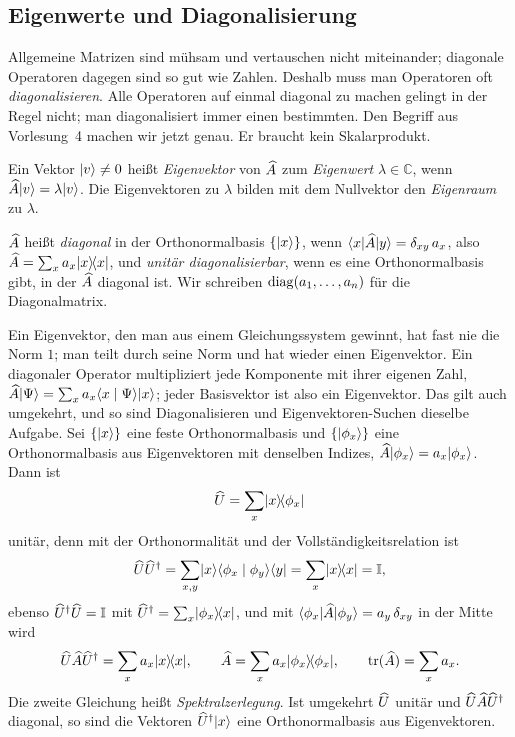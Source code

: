 \subsection{Eigenwerte und Diagonalisierung}
Allgemeine Matrizen sind mühsam und vertauschen nicht miteinander; diagonale Operatoren dagegen sind so gut wie Zahlen. Deshalb muss man Operatoren oft \emph{diagonalisieren}. Alle Operatoren auf einmal diagonal zu machen gelingt in der Regel nicht; man diagonalisiert immer einen bestimmten. Den Begriff aus Vorlesung~4 machen wir jetzt genau. Er braucht kein Skalarprodukt.
\begin{definition}
	Ein Vektor $\lvert v \rangle\neq 0$ heißt \emph{Eigenvektor} von $\widehat{A}$ zum \emph{Eigenwert} $\lambda\in\mathbb{C}$, wenn $\widehat{A}\lvert v \rangle = \lambda\lvert v \rangle$. Die Eigenvektoren zu $\lambda$ bilden mit dem Nullvektor den \emph{Eigenraum} zu $\lambda$.

	$\widehat{A}$ heißt \emph{diagonal} in der Orthonormalbasis $\{\lvert x \rangle\}$, wenn $\langle x \rvert \widehat{A} \lvert y \rangle = \delta_{xy}\,a_x$, also $\widehat{A} = \sum_x a_x\lvert x \rangle\!\langle x \rvert$, und \emph{unitär diagonalisierbar}, wenn es eine Orthonormalbasis gibt, in der $\widehat{A}$ diagonal ist. Wir schreiben $\operatorname{diag}(a_1,\dots,a_n)$ für die Diagonalmatrix.
\end{definition}
Ein Eigenvektor, den man aus einem Gleichungssystem gewinnt, hat fast nie die Norm $1$; man teilt durch seine Norm und hat wieder einen Eigenvektor. Ein diagonaler Operator multipliziert jede Komponente mit ihrer eigenen Zahl, $\widehat{A}\lvert \Psi \rangle = \sum_x a_x\langle x \mid \Psi \rangle\lvert x \rangle$; jeder Basisvektor ist also ein Eigenvektor. Das gilt auch umgekehrt, und so sind Diagonalisieren und Eigenvektoren-Suchen dieselbe Aufgabe. Sei $\{\lvert x \rangle\}$ eine feste Orthonormalbasis und $\{\lvert \phi_x \rangle\}$ eine Orthonormalbasis aus Eigenvektoren mit denselben Indizes, $\widehat{A}\lvert \phi_x \rangle = a_x\lvert \phi_x \rangle$. Dann ist
\begin{equation}
	\widehat{U} = \sum_x \lvert x \rangle\!\langle \phi_x \rvert
\end{equation}
unitär, denn mit der Orthonormalität und der Vollständigkeitsrelation ist
\begin{equation}
	\widehat{U}\widehat{U}^{\dagger} = \sum_{x,y} \lvert x \rangle\langle \phi_x \mid \phi_y \rangle\langle y \rvert = \sum_x \lvert x \rangle\!\langle x \rvert = \mathbb{I},
\end{equation}
ebenso $\widehat{U}^{\dagger}\widehat{U} = \mathbb{I}$ mit $\widehat{U}^{\dagger} = \sum_x\lvert \phi_x \rangle\!\langle x \rvert$, und mit $\langle \phi_x \rvert \widehat{A} \lvert \phi_y \rangle = a_y\,\delta_{xy}$ in der Mitte wird
\begin{equation}
	\widehat{U}\widehat{A}\widehat{U}^{\dagger} = \sum_x a_x \lvert x \rangle\!\langle x \rvert, \qquad
	\widehat{A} = \sum_x a_x \lvert \phi_x \rangle\!\langle \phi_x \rvert, \qquad
	\operatorname{tr}(\widehat{A}) = \sum_x a_x.
\end{equation}
Die zweite Gleichung heißt \emph{Spektralzerlegung}. Ist umgekehrt $\widehat{U}$ unitär und $\widehat{U}\widehat{A}\widehat{U}^{\dagger}$ diagonal, so sind die Vektoren $\widehat{U}^{\dagger}\lvert x \rangle$ eine Orthonormalbasis aus Eigenvektoren.

